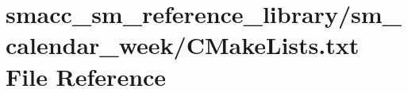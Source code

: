 \hypertarget{sm__reference__library_2sm__calendar__week_2CMakeLists_8txt}{}\section{smacc\+\_\+sm\+\_\+reference\+\_\+library/sm\+\_\+calendar\+\_\+week/\+C\+Make\+Lists.txt File Reference}
\label{sm__reference__library_2sm__calendar__week_2CMakeLists_8txt}
